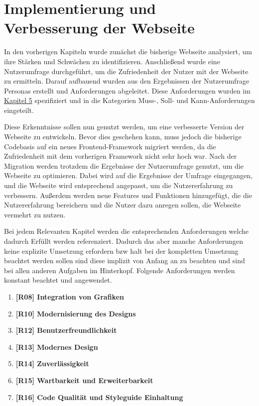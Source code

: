 
\chapter{Implementierung und Verbesserung der Webseite}
\label{chapter:6}

In den vorherigen Kapiteln wurde zunächst die bisherige Webseite analysiert, um ihre Stärken und Schwächen zu identifizieren. Anschließend wurde eine Nutzerumfrage durchgeführt, um die Zufriedenheit der Nutzer mit der Webseite zu ermitteln. Darauf aufbauend wurden aus den Ergebnissen der Nutzerumfrage Personas erstellt und Anforderungen abgeleitet. Diese Anforderungen wurden im \hyperref[chapter:5]{Kapitel 5} spezifiziert und in die Kategorien Muss-, Soll- und Kann-Anforderungen eingeteilt.

Diese Erkenntnisse sollen nun genutzt werden, um eine verbesserte Version der Webseite zu entwickeln. Bevor dies geschehen kann, muss jedoch die bisherige Codebasis auf ein neues Frontend-Framework migriert werden, da die Zufriedenheit mit dem vorherigen Framework nicht sehr hoch war. Nach der Migration werden trotzdem die Ergebnisse der Nutzerumfrage genutzt, um die Webseite zu optimieren. Dabei wird auf die Ergebnisse der Umfrage eingegangen, und die Webseite wird entsprechend angepasst, um die Nutzererfahrung zu verbessern. Außerdem werden neue Features und Funktionen hinzugefügt, die die Nutzererfahrung bereichern und die Nutzer dazu anregen sollen, die Webseite vermehrt zu nutzen.

Bei jedem Relevanten Kapitel werden die entsprechenden Anforderungen welche dadurch Erfüllt werden referenziert. Dadurch das aber manche Anforderungen keine explizite Umsetzung erfordern bzw halt bei der kompletten Umsetzung beachtet werden sollen sind diese implizit von Anfang an zu beachten und sind bei allen anderen Aufgaben im Hinterkopf. Folgende Anforderungen werden konstant beachtet und angewendet.

\begin{enumerate}

    \item \textbf{[R08] Integration von Grafiken}
    \item \textbf{[R10] Modernisierung des Designs}
    \item \textbf{[R12] Benutzerfreundlichkeit}
    \item \textbf{[R13] Modernes Design}
    \item \textbf{[R14] Zuverlässigkeit}
    \item \textbf{[R15] Wartbarkeit und Erweiterbarkeit}
    \item \textbf{[R16] Code Qualität und Styleguide Einhaltung}

\end{enumerate}


